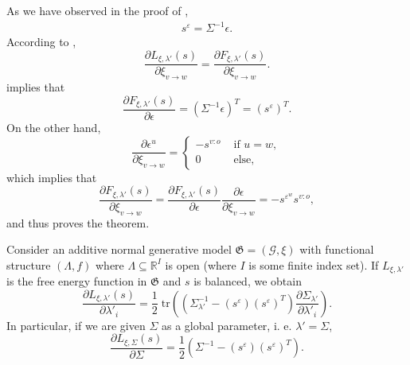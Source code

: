 \documentclass[a4paper,11pt]{report}
\newcommand{\tr}{\;\text{tr}}
\begin{document}
\begin{Bew}
As we have observed in the proof of , 
\begin{align*}
s^{\varepsilon}=\Sigma^{-1}\epsilon.
\end{align*}
According to ,
\[
\frac{\partial L_{\xi,\lambda'}(s)}{\partial\xi_{v\to w}}=\frac{\partial F_{\xi,\lambda'}(s)}{\partial\xi_{v\to w}}.
\]
 implies that
\[
\frac{\partial F_{\xi,\lambda'}(s)}{\partial\epsilon}=(\Sigma^{-1}\epsilon)^T=\left(s^{\varepsilon}\right)^T.
\]
On the other hand,
\[
\frac{\partial\epsilon^u}{\partial \xi_{v\to w}}=\begin{cases}
-s^{v:o}&\text{ if }u=w,\\
0 &\text{ else},
\end{cases}
\]
which implies that
\[
\frac{\partial F_{\xi,\lambda'}(s)}{\partial\xi_{v\to w}}=
\frac{\partial F_{\xi,\lambda'}(s)}{\partial\epsilon}
\frac{\partial\epsilon}{\partial\xi_{v\to w}}=
-s^{\varepsilon^w}s^{v:o},
\]
and thus proves the theorem.
\end{Bew}

\begin{The}\label{learning-lambda}
Consider an additive normal generative model $\mathfrak{G}=(\mathcal{G},\xi)$ with functional structure $(\Lambda,f)$ where $\Lambda\subseteq\mathbb{R}^I$ is open (where $I$ is some finite index set). If $L_{\xi,\lambda'}$ is the free energy function in $\mathfrak{G}$ and $s$ is balanced, we obtain
\begin{equation}\label{eq:learning-lambda}
\frac{\partial L_{\xi,\lambda'}(s)}{\partial\lambda'_i}=
\frac12\tr\left(\left(\Sigma_{\lambda'}^{-1}-\left(s^{\varepsilon}\right)\left(s^{\varepsilon}\right)^T\right)\frac{\partial\Sigma_{\lambda'}}{\partial\lambda'_i}\right).
\end{equation}
In particular, if we are given $\Sigma$ as a global parameter, i. e. $\lambda'=\Sigma$, 
\begin{equation}\label{eq:learning-sigma}
\frac{\partial L_{\xi,\Sigma}(s)}{\partial\Sigma}=
\frac12\left(\Sigma^{-1}-\left(s^{\varepsilon}\right)\left(s^{\varepsilon}\right)^T\right)
.
\end{equation}
\end{The}
\end{document}
